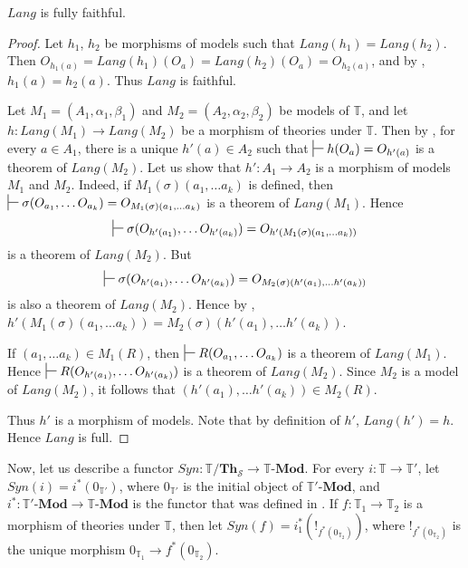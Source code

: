 \documentclass[reqno]{amsart}
\theoremstyle{definition}
\theoremstyle{remark}
\newcommand{\cat}[1]{\mathbf{#1}}
\newcommand{\Mod}[1]{#1\text{-}\cat{Mod}}
\newcommand{\Th}{\cat{Th}}
\numberwithin{figure}{section}
\begin{document}
\begin{prop}[lang-ff]
$Lang$ is fully faithful.
\end{prop}
\begin{proof}
Let $h_1$, $h_2$ be morphisms of models such that $Lang(h_1) = Lang(h_2)$.
Then $O_{h_1(a)} = Lang(h_1)(O_a) = Lang(h_2)(O_a) = O_{h_2(a)}$, and by , $h_1(a) = h_2(a)$.
Thus $Lang$ is faithful.

Let $M_1 = (A_1,\alpha_1,\beta_1)$ and $M_2 = (A_2,\alpha_2,\beta_2)$ be models of $\mathbb{T}$,
    and let $h : Lang(M_1) \to Lang(M_2)$ be a morphism of theories under $\mathbb{T}$.
Then by , for every $a \in A_1$, there is a unique $h'(a) \in A_2$ such that $\sststile{}{} h(O_a) = O_{h'(a)}$ is a theorem of $Lang(M_2)$.
Let us show that $h' : A_1 \to A_2$ is a morphism of models $M_1$ and $M_2$.
Indeed, if $M_1(\sigma)(a_1, \ldots a_k)$ is defined, then $\sststile{}{} \sigma(O_{a_1}, \ldots O_{a_k}) = O_{M_1(\sigma)(a_1, \ldots a_k)}$ is a theorem of $Lang(M_1)$.
Hence \[ \sststile{}{} \sigma(O_{h'(a_1)}, \ldots O_{h'(a_k)}) = O_{h'(M_1(\sigma)(a_1, \ldots a_k))} \] is a theorem of $Lang(M_2)$.
But \[ \sststile{}{} \sigma(O_{h'(a_1)}, \ldots O_{h'(a_k)}) = O_{M_2(\sigma)(h'(a_1), \ldots h'(a_k))} \] is also a theorem of $Lang(M_2)$.
Hence by , $h'(M_1(\sigma)(a_1, \ldots a_k)) = M_2(\sigma)(h'(a_1), \ldots h'(a_k))$.

If $(a_1, \ldots a_k) \in M_1(R)$, then $\sststile{}{} R(O_{a_1}, \ldots O_{a_k})$ is a theorem of $Lang(M_1)$.
Hence $\sststile{}{} R(O_{h'(a_1)}, \ldots O_{h'(a_k)})$ is a theorem of $Lang(M_2)$.
Since $M_2$ is a model of $Lang(M_2)$, it follows that $(h'(a_1), \ldots h'(a_k)) \in M_2(R)$.

Thus $h'$ is a morphism of models.
Note that by definition of $h'$, $Lang(h') = h$.
Hence $Lang$ is full.
\end{proof}

Now, let us describe a functor $Syn : \mathbb{T}/\Th_\mathcal{S} \to \Mod{\mathbb{T}}$.
For every $i : \mathbb{T} \to \mathbb{T}'$, let $Syn(i) = i^*(0_{\mathbb{T}'})$, where $0_{\mathbb{T}'}$ is the initial object of $\Mod{\mathbb{T}'}$,
    and $i^* : \Mod{\mathbb{T}'} \to \Mod{\mathbb{T}}$ is the functor that was defined in \cite{alg-tt}.
If $f : \mathbb{T}_1 \to \mathbb{T}_2$ is a morphism of theories under $\mathbb{T}$, then let $Syn(f) = i_1^*(!_{f^*(0_{\mathbb{T}_2})})$,
    where $!_{f^*(0_{\mathbb{T}_2})}$ is the unique morphism $0_{\mathbb{T}_1} \to f^*(0_{\mathbb{T}_2})$.
\end{document}
